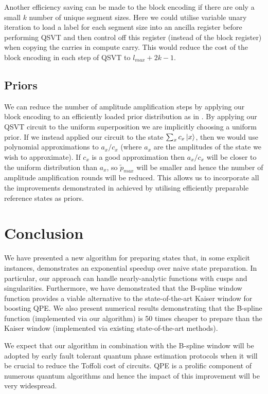 Another efficiency saving can be made to the block encoding if there are only a small $k$ number of unique segment sizes. Here we could utilise variable unary iteration to load a label for each segment size into an ancilla register before performing QSVT and then control off this register (instead of the block register) when copying the carries in compute carry. This would reduce the cost of the block encoding in each step of QSVT to $l_{max} + 2 k - 1$.

\subsection{Priors} We can reduce the number of amplitude amplification steps by applying our block encoding to an efficiently loaded prior distribution as in \cite{Lemieux:2024pmt, Babbush_2019}. By applying our QSVT circuit to the uniform superposition we are implicitly choosing a uniform prior. If we instead applied our circuit to the state $\sum_x c_x \ket{x}$, then we would use polynomial approximations to $a_x/c_x$ (where $a_x$ are the amplitudes of the state we wish to approximate). If $c_x$ is a good approximation then $a_x/c_x$ will be closer to the uniform distribution than $a_x$, so $\tilde{p}_{max}$ will be smaller and hence the number of amplitude amplification rounds will be reduced. This allows us to incorporate all the improvements demonstrated in \cite{Lemieux:2024pmt} achieved by utilising efficiently preparable reference states as priors.

\section{Conclusion}
We have presented a new algorithm for preparing states that, in some explicit instances, demonstrates an exponential speedup over naive state preparation. In particular, our approach can handle nearly-analytic functions with cusps and singularities. Furthermore, we have demonstrated that the B-spline window function provides a viable alternative to the state-of-the-art Kaiser window for boosting QPE. We also present numerical results demonstrating that the B-spline function (implemented via our algorithm) is 50 times cheaper to prepare than the Kaiser window (implemented via existing state-of-the-art methods).

We expect that our algorithm in combination with the B-spline window will be adopted by early fault tolerant quantum phase estimation protocols when it will be crucial to reduce the Toffoli cost of circuits. QPE is a prolific component of numerous quantum algorithms and hence the impact of this improvement will be very widespread.

